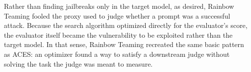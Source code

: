 Rather than finding jailbreaks only in the target model, as desired, Rainbow Teaming fooled the proxy used to judge whether a prompt was a successful attack. 
Because the search algorithm optimized directly for the evaluator's score, the evaluator itself became the vulnerability to be exploited rather than the target model.
In that sense, Rainbow Teaming recreated the same basic pattern as ACES: an optimizer found a way to satisfy a downstream judge without solving the task the judge was meant to measure.

